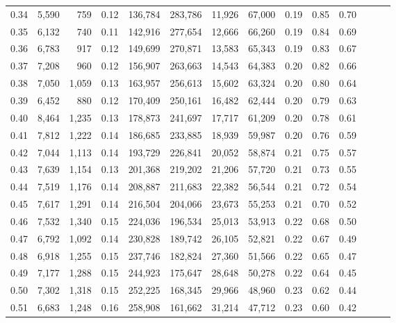 \begin{tabular}{rrrrrrrrrrrrrr}
0.34 &   5,590 &    759 &  0.12 &  136,784 &  283,786 &  11,926 &  67,000 &  0.19 &  0.85 &      0.70 \\
0.35 &   6,132 &    740 &  0.11 &  142,916 &  277,654 &  12,666 &  66,260 &  0.19 &  0.84 &      0.69 \\
0.36 &   6,783 &    917 &  0.12 &  149,699 &  270,871 &  13,583 &  65,343 &  0.19 &  0.83 &      0.67 \\
0.37 &   7,208 &    960 &  0.12 &  156,907 &  263,663 &  14,543 &  64,383 &  0.20 &  0.82 &      0.66 \\
0.38 &   7,050 &  1,059 &  0.13 &  163,957 &  256,613 &  15,602 &  63,324 &  0.20 &  0.80 &      0.64 \\
0.39 &   6,452 &    880 &  0.12 &  170,409 &  250,161 &  16,482 &  62,444 &  0.20 &  0.79 &      0.63 \\
0.40 &   8,464 &  1,235 &  0.13 &  178,873 &  241,697 &  17,717 &  61,209 &  0.20 &  0.78 &      0.61 \\
0.41 &   7,812 &  1,222 &  0.14 &  186,685 &  233,885 &  18,939 &  59,987 &  0.20 &  0.76 &      0.59 \\
0.42 &   7,044 &  1,113 &  0.14 &  193,729 &  226,841 &  20,052 &  58,874 &  0.21 &  0.75 &      0.57 \\
0.43 &   7,639 &  1,154 &  0.13 &  201,368 &  219,202 &  21,206 &  57,720 &  0.21 &  0.73 &      0.55 \\
0.44 &   7,519 &  1,176 &  0.14 &  208,887 &  211,683 &  22,382 &  56,544 &  0.21 &  0.72 &      0.54 \\
0.45 &   7,617 &  1,291 &  0.14 &  216,504 &  204,066 &  23,673 &  55,253 &  0.21 &  0.70 &      0.52 \\
0.46 &   7,532 &  1,340 &  0.15 &  224,036 &  196,534 &  25,013 &  53,913 &  0.22 &  0.68 &      0.50 \\
0.47 &   6,792 &  1,092 &  0.14 &  230,828 &  189,742 &  26,105 &  52,821 &  0.22 &  0.67 &      0.49 \\
0.48 &   6,918 &  1,255 &  0.15 &  237,746 &  182,824 &  27,360 &  51,566 &  0.22 &  0.65 &      0.47 \\
0.49 &   7,177 &  1,288 &  0.15 &  244,923 &  175,647 &  28,648 &  50,278 &  0.22 &  0.64 &      0.45 \\
0.50 &   7,302 &  1,318 &  0.15 &  252,225 &  168,345 &  29,966 &  48,960 &  0.23 &  0.62 &      0.44 \\
0.51 &   6,683 &  1,248 &  0.16 &  258,908 &  161,662 &  31,214 &  47,712 &  0.23 &  0.60 &      0.42 \\

\end{tabular}
